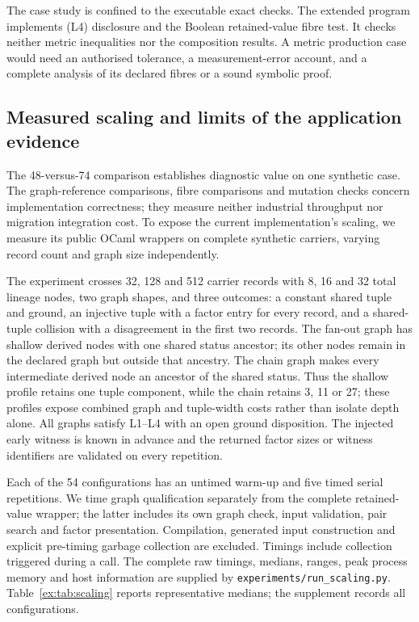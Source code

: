 \documentclass[smallextended,envcountsect,envcountsame,natbib]{svjour3}
\begin{document}
The case study is confined to the executable exact checks. The extended program implements (L4) disclosure and the Boolean retained-value fibre test. It checks neither metric inequalities nor the composition results. A metric production case would need an authorised tolerance, a measurement-error account, and a complete analysis of its declared fibres or a sound symbolic proof.

\subsection{Measured scaling and limits of the application evidence}\label{ex:sec:scaling}
The 48-versus-74 comparison establishes diagnostic value on one synthetic case. The graph-reference comparisons, fibre comparisons and mutation checks concern implementation correctness; they measure neither industrial throughput nor migration integration cost. To expose the current implementation's scaling, we measure its public OCaml wrappers on complete synthetic carriers, varying record count and graph size independently.

The experiment crosses 32, 128 and 512 carrier records with 8, 16 and 32 total lineage nodes, two graph shapes, and three outcomes: a constant shared tuple and ground, an injective tuple with a factor entry for every record, and a shared-tuple collision with a disagreement in the first two records. The fan-out graph has shallow derived nodes with one shared status ancestor; its other nodes remain in the declared graph but outside that ancestry. The chain graph makes every intermediate derived node an ancestor of the shared status. Thus the shallow profile retains one tuple component, while the chain retains 3, 11 or 27; these profiles expose combined graph and tuple-width costs rather than isolate depth alone. All graphs satisfy L1--L4 with an open ground disposition. The injected early witness is known in advance and the returned factor sizes or witness identifiers are validated on every repetition.

Each of the 54 configurations has an untimed warm-up and five timed serial repetitions. We time graph qualification separately from the complete retained-value wrapper; the latter includes its own graph check, input validation, pair search and factor presentation. Compilation, generated input construction and explicit pre-timing garbage collection are excluded. Timings include collection triggered during a call. The complete raw timings, medians, ranges, peak process memory and host information are supplied by \nolinkurl{experiments/run_scaling.py}. Table~\ref{ex:tab:scaling} reports representative medians; the supplement records all configurations.
\end{document}

